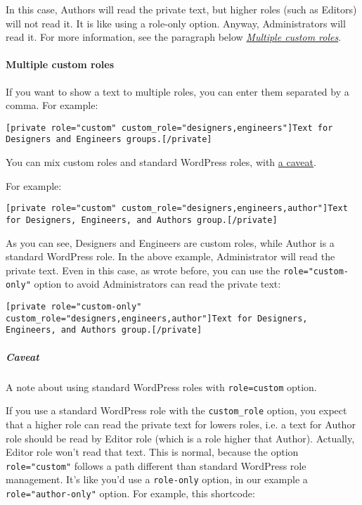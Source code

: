 \documentclass[a4paper,11pt]{article}
\begin{document}
In this case, Authors will read the private text, but higher roles (such as Editors) will not read it. It is like using a role-only option. Anyway, Administrators will read it. For more information, see the paragraph below \textit{\hyperref[multiple-custom-roles]{Multiple custom roles}}.

\paragraph{Multiple custom roles}\label{multiple-custom-roles}

If you want to show a text to multiple roles, you can enter them separated by a comma. For example:

\begin{lstlisting}
[private role="custom" custom_role="designers,engineers"]Text for Designers and Engineers groups.[/private]
\end{lstlisting}

You can mix custom roles and standard WordPress roles, with \hyperref[caveat]{a caveat}.

For example:

\begin{lstlisting}
[private role="custom" custom_role="designers,engineers,author"]Text for Designers, Engineers, and Authors group.[/private]
\end{lstlisting}

As you can see, Designers and Engineers are custom roles, while Author is a standard WordPress role. In the above example, Administrator will read the private text. Even in this case, as wrote before, you can use the \verb+role="custom-only"+ option to avoid Administrators can read the private text:

\begin{lstlisting}
[private role="custom-only" custom_role="designers,engineers,author"]Text for Designers, Engineers, and Authors group.[/private]
\end{lstlisting}

\subparagraph{Caveat} \label{caveat}

A note about using standard WordPress roles with \verb+role=custom+ option.

If you use a standard WordPress role with the \verb+custom_role+ option, you expect that a higher role can read the private text for lowers roles, i.e. a text for Author role should be read by Editor role (which is a role higher that Author). Actually, Editor role won't read that text. This is normal, because the option \verb+role="custom"+ follows a path different than standard WordPress role management. It's like you'd use a \verb+role-only+ option, in our example a \verb+role="author-only"+ option. For example, this shortcode:
\end{document}
